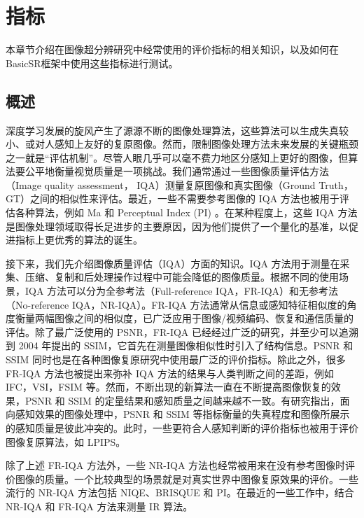 \documentclass[../main.tex]{subfiles}
\begin{document}
\chapter{指标}
\vspace{-2cm}

本章节介绍在图像超分辨研究中经常使用的评价指标的相关知识，以及如何在BasicSR框架中使用这些指标进行测试。


\section{概述}


深度学习发展的旋风产生了源源不断的图像处理算法，这些算法可以生成失真较小、或对人感知上友好的复原图像。然而，限制图像处理方法未来发展的关键瓶颈之一就是“评估机制”。尽管人眼几乎可以毫不费力地区分感知上更好的图像，但算法要公平地衡量视觉质量是一项挑战。我们通常通过一些图像质量评估方法（Image quality assessment， IQA）测量复原图像和真实图像（Ground Truth，GT）之间的相似性来评估。最近，一些不需要参考图像的 IQA 方法也被用于评估各种算法，例如 Ma 和 Perceptual Index (PI) 。在某种程度上，这些 IQA 方法是图像处理领域取得长足进步的主要原因，因为他们提供了一个量化的基准，以促进指标上更优秀的算法的诞生。

接下来，我们先介绍图像质量评估（IQA）方面的知识。IQA 方法用于测量在采集、压缩、复制和后处理操作过程中可能会降低的图像质量。根据不同的使用场景，IQA 方法可以分为全参考法（Full-reference IQA，FR-IQA）和无参考法（No-reference IQA，NR-IQA）。FR-IQA 方法通常从信息或感知特征相似度的角度衡量两幅图像之间的相似度，已广泛应用于图像/视频编码、恢复和通信质量的评估。除了最广泛使用的 PSNR，FR-IQA 已经经过广泛的研究，并至少可以追溯到 2004 年提出的 SSIM，它首先在测量图像相似性时引入了结构信息。PSNR 和 SSIM 同时也是在各种图像复原研究中使用最广泛的评价指标。除此之外，很多 FR-IQA 方法也被提出来弥补 IQA 方法的结果与人类判断之间的差距，例如 IFC，VSI，FSIM 等。然而，不断出现的新算法一直在不断提高图像恢复的效果，PSNR 和 SSIM 的定量结果和感知质量之间越来越不一致。有研究指出，面向感知效果的图像处理中，PSNR 和 SSIM 等指标衡量的失真程度和图像所展示的感知质量是彼此冲突的。此时，一些更符合人感知判断的评价指标也被用于评价图像复原算法，如 LPIPS。

除了上述 FR-IQA 方法外，一些 NR-IQA 方法也经常被用来在没有参考图像时评价图像的质量。一个比较典型的场景就是对真实世界中图像复原效果的评价。一些流行的 NR-IQA 方法包括 NIQE、BRISQUE 和 PI。在最近的一些工作中，结合 NR-IQA 和 FR-IQA 方法来测量 IR 算法。
\end{document}
